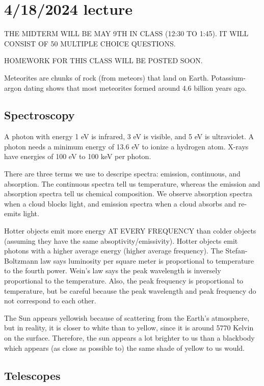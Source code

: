 \documentclass[class=article, crop=false]{standalone}
\begin{document}
\section{4/18/2024 lecture}
THE MIDTERM WILL BE MAY 9TH IN CLASS (12:30 TO 1:45). IT WILL CONSIST OF 50 MULTIPLE CHOICE QUESTIONS.
\par
HOMEWORK FOR THIS CLASS WILL BE POSTED SOON.
\par
Meteorites are chunks of rock (from meteors) that land on Earth. Potassium-argon dating shows that most meteorites formed around 4.6 billion years ago.
\subsection{Spectroscopy}
\par
A photon with energy 1 eV is infrared, 3 eV is visible, and 5 eV is ultraviolet. A photon needs a minimum energy of 13.6 eV to ionize a hydrogen atom. X-rays have energies of 100 eV to 100 keV per photon.
\par
There are three terms we use to descripe spectra: emission, continuous, and absorption. The continuous spectra tell us temperature, whereas the emission and absorption spectra tell us chemical composition. We observe absorption spectra when a cloud blocks light, and emission spectra when a cloud absorbs and re-emits light.
\par
Hotter objects emit more energy AT EVERY FREQUENCY than colder objects (assuming they have the same absoptivity/emissivity). Hotter objects emit photons with a higher average energy (higher average frequency). The Stefan-Boltzmann law says luminosity per square meter is proportional to temperature to the fourth power. Wein's law says the peak wavelength is inversely proportional to the temperature. Also, the peak frequency is proportional to temperature, but be careful because the peak wavelength and peak frequency do not correspond to each other.
\begin{note}
    The Sun appears yellowish because of scattering from the Earth's atmosphere, but in reality, it is closer to white than to yellow, since it is around 5770 Kelvin on the surface. Therefore, the sun appears a lot brighter to us than a blackbody which appears (as close as possible to) the same shade of yellow to us would.
\end{note}
\subsection{Telescopes}
\end{document}
